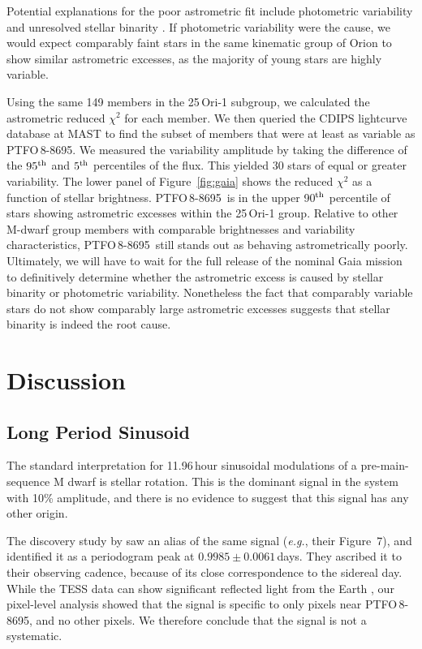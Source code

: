 \documentclass[12pt,twocolumn,tighten]{aastex62}
\newcommand{\ptfo}{PTFO$\,$8-8695}
\begin{document}
Potential explanations for the poor astrometric fit include
photometric variability and unresolved stellar binarity \citep[{\it
e.g.},][]{rizzuto_ZEIT8_2018,belokurov_unresolved_2020}.  If
photometric variability were the cause, we would expect comparably
faint stars in the same kinematic group of Orion to show similar
astrometric excesses, as the majority of young stars are highly
variable.

Using the same 149 members in the 25$\,$Ori-1 subgroup, we calculated
the astrometric reduced $\chi^2$ for each member.  We then queried the
CDIPS lightcurve database at MAST \citep{bouma_cluster_2019} to find
the subset of members that were at least as variable as \ptfo.
We measured the variability amplitude by taking the difference of the
$95^{\rm th}$ and $5^{\rm th}$ percentiles of the flux.
This yielded 30 stars of equal or greater variability.
The lower panel of Figure~\ref{fig:gaia} shows the
reduced $\chi^2$ as a function of stellar brightness.  \ptfo\ is in
the upper 90$^{\rm th}$ percentile of stars showing astrometric
excesses within the 25$\,$Ori-1 group.  Relative to other M-dwarf
group members with comparable brightnesses and variability
characteristics, \ptfo\ still stands out as behaving astrometrically
poorly.  Ultimately, we will have to wait for the full release of the
nominal Gaia mission to definitively determine whether the astrometric
excess is caused by stellar binarity or photometric variability.
Nonetheless the fact that comparably variable stars do not show
comparably large astrometric excesses suggests that stellar binarity
is indeed the root cause.


\section{Discussion}
\label{sec:discussion}

\subsection{Long Period Sinusoid}

The standard interpretation for 11.96$\,$hour sinusoidal modulations
of a pre-main-sequence M dwarf is stellar rotation.  This is the
dominant signal in the system with 10\% amplitude, and there is no
evidence to suggest that this signal has any other origin.

The discovery study by \citet{van_eyken_ptf_2012} saw an alias of the
same signal ({\it e.g.}, their Figure~7), and identified it as a
periodogram peak at $0.9985 \pm 0.0061\,$days. They ascribed it to
their observing cadence, because of its close correspondence to the
sidereal day.  While the TESS data can show significant reflected
light from the Earth \citep[{\it e.g.},][]{luger_tess_2019}, our
pixel-level analysis showed that the signal is specific to only pixels
near \ptfo, and no other pixels.  We therefore conclude that the
signal is not a systematic.
\end{document}
